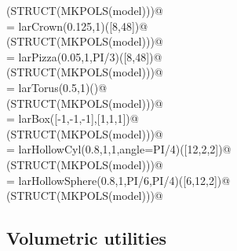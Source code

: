 \documentclass[11pt,oneside]{article}	%
\begin{document}
\begin{flushleft}
\begin{list}{}{}
\mbox{}\verb@VIEW(STRUCT(MKPOLS(model)))@\\
\mbox{}\verb@model = larCrown(0.125,1)([8,48])@\\
\mbox{}\verb@VIEW(STRUCT(MKPOLS(model)))@\\
\mbox{}\verb@model = larPizza(0.05,1,PI/3)([8,48])@\\
\mbox{}\verb@VIEW(STRUCT(MKPOLS(model)))@\\
\mbox{}\verb@model = larTorus(0.5,1)()@\\
\mbox{}\verb@VIEW(STRUCT(MKPOLS(model)))@\\
\mbox{}\verb@model = larBox([-1,-1,-1],[1,1,1])@\\
\mbox{}\verb@VIEW(STRUCT(MKPOLS(model)))@\\
\mbox{}\verb@model = larHollowCyl(0.8,1,1,angle=PI/4)([12,2,2])@\\
\mbox{}\verb@VIEW(STRUCT(MKPOLS(model)))@\\
\mbox{}\verb@model = larHollowSphere(0.8,1,PI/6,PI/4)([6,12,2])@\\
\mbox{}\verb@VIEW(STRUCT(MKPOLS(model)))@\\
\mbox{}\verb@@{\NWsep}
\end{list}
\vspace{-2ex}
\end{flushleft}


\subsection{Volumetric utilities}
\end{document}
